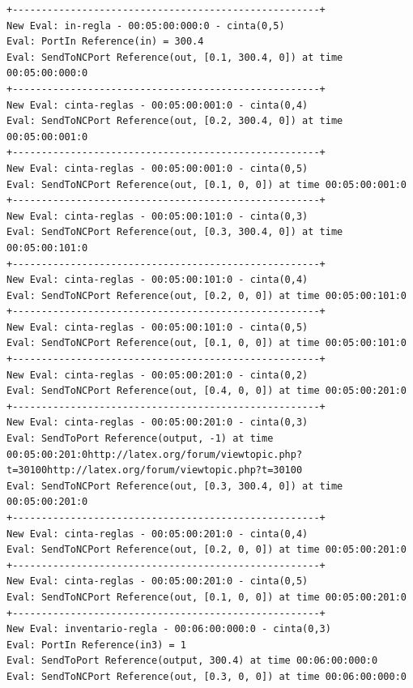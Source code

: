 \documentclass[10pt]{article}
\begin{document}
\begin{minipage}{1\textwidth}
	\centering
	\begin{lstlisting}
+-----------------------------------------------------+
New Eval: in-regla - 00:05:00:000:0 - cinta(0,5)
Eval: PortIn Reference(in) = 300.4
Eval: SendToNCPort Reference(out, [0.1, 300.4, 0]) at time 00:05:00:000:0
+-----------------------------------------------------+
New Eval: cinta-reglas - 00:05:00:001:0 - cinta(0,4)
Eval: SendToNCPort Reference(out, [0.2, 300.4, 0]) at time 00:05:00:001:0
+-----------------------------------------------------+
New Eval: cinta-reglas - 00:05:00:001:0 - cinta(0,5)
Eval: SendToNCPort Reference(out, [0.1, 0, 0]) at time 00:05:00:001:0
+-----------------------------------------------------+
New Eval: cinta-reglas - 00:05:00:101:0 - cinta(0,3)
Eval: SendToNCPort Reference(out, [0.3, 300.4, 0]) at time 00:05:00:101:0
+-----------------------------------------------------+
New Eval: cinta-reglas - 00:05:00:101:0 - cinta(0,4)
Eval: SendToNCPort Reference(out, [0.2, 0, 0]) at time 00:05:00:101:0
+-----------------------------------------------------+
New Eval: cinta-reglas - 00:05:00:101:0 - cinta(0,5)
Eval: SendToNCPort Reference(out, [0.1, 0, 0]) at time 00:05:00:101:0
+-----------------------------------------------------+
New Eval: cinta-reglas - 00:05:00:201:0 - cinta(0,2)
Eval: SendToNCPort Reference(out, [0.4, 0, 0]) at time 00:05:00:201:0
+-----------------------------------------------------+
New Eval: cinta-reglas - 00:05:00:201:0 - cinta(0,3)
Eval: SendToPort Reference(output, -1) at time 00:05:00:201:0http://latex.org/forum/viewtopic.php?t=30100http://latex.org/forum/viewtopic.php?t=30100
Eval: SendToNCPort Reference(out, [0.3, 300.4, 0]) at time 00:05:00:201:0
+-----------------------------------------------------+
New Eval: cinta-reglas - 00:05:00:201:0 - cinta(0,4)
Eval: SendToNCPort Reference(out, [0.2, 0, 0]) at time 00:05:00:201:0
+-----------------------------------------------------+
New Eval: cinta-reglas - 00:05:00:201:0 - cinta(0,5)
Eval: SendToNCPort Reference(out, [0.1, 0, 0]) at time 00:05:00:201:0
+-----------------------------------------------------+
New Eval: inventario-regla - 00:06:00:000:0 - cinta(0,3)
Eval: PortIn Reference(in3) = 1
Eval: SendToPort Reference(output, 300.4) at time 00:06:00:000:0
Eval: SendToNCPort Reference(out, [0.3, 0, 0]) at time 00:06:00:000:0
	\end{lstlisting}	
\end{minipage}
\end{document}
